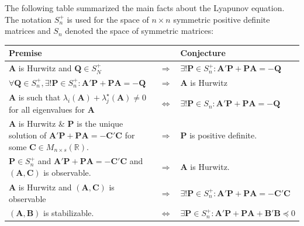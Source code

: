 \documentclass[a4paper,10pt,oneside]{book}
\begin{document}
The following table summarized the main facts about the Lyapunov equation. The notation
$S_n^+$ is used for the space of $n\times n$ symmetric positive definite matrices and
$S_n$ denoted the space of symmetric matrices:
\begin{center}
 \begin{tabular}{p{6cm} c p{5cm}}
Premise & & Conjecture\\
\hline
$\mathbf{A}$ is Hurwitz and $\mathbf{Q}\in S_N^+$ &\hyperlink{lyapLTI}{$\Rightarrow$}&  $\exists!\mathbf{P}\in S_n^+:\mathbf{A}'\mathbf{P}+\mathbf{PA}=-\mathbf{Q}$\\

$\forall\mathbf{Q}\in S_n^+,\exists!\mathbf{P}\in S_n^+:\mathbf{A}'\mathbf{P}+\mathbf{PA}=-\mathbf{Q}$ &\hyperlink{lyapLTI}{$\Rightarrow$}& $\mathbf{A}$ is Hurwitz\\

$\mathbf{A}$ is such that $\lambda_i(\mathbf{A})+\lambda_j^\star(\mathbf{A})\neq 0$ for all eigenvalues for $\mathbf{A}$ 
&\hyperlink{prop:lyap32}{$\Leftrightarrow$}& $\exists!\mathbf{P}\in S_n:\mathbf{A}'\mathbf{P}+\mathbf{PA}=-\mathbf{Q}$\\

$\mathbf{A}$ is Hurwitz \& $\mathbf{P}$ is the unique solution of $\mathbf{A}'\mathbf{P}+\mathbf{PA}=-\mathbf{C}'\mathbf{C}$ for some $\mathbf{C}\in M_{n\times s}(\mathbb{R})$. &\hyperlink{prop:AhurwitzPpsd}{$\Rightarrow$}& $\mathbf{P}$ is positive definite.\\

$\mathbf{P}\in S_n^+$ and $\mathbf{A}'\mathbf{P}+\mathbf{PA}=-\mathbf{C}'\mathbf{C}$ and $(\mathbf{A},\mathbf{C})$ is observable. 
&\hyperlink{LyapEqnObs}{$\Rightarrow$}& $\mathbf{A}$ is Hurwitz.\\

$\mathbf{A}$ is Hurwitz and $(\mathbf{A},\mathbf{C})$ is observable 
&\hyperlink{LyapEqnObs}{$\Rightarrow$}& $\exists!\mathbf{P}\in S_n^+:\mathbf{A}'\mathbf{P}+\mathbf{PA}=-\mathbf{C}'\mathbf{C}$\\

$(\mathbf{A},\mathbf{B})$ is stabilizable. &\hyperlink{LyapStabilizability}{$\Leftrightarrow$}& $\exists\mathbf{P}\in S_n^+:\mathbf{A}'\mathbf{P}+\mathbf{PA}+\mathbf{B}'\mathbf{B}\preceq 0$
\end{tabular}
\end{center}
\end{document}
